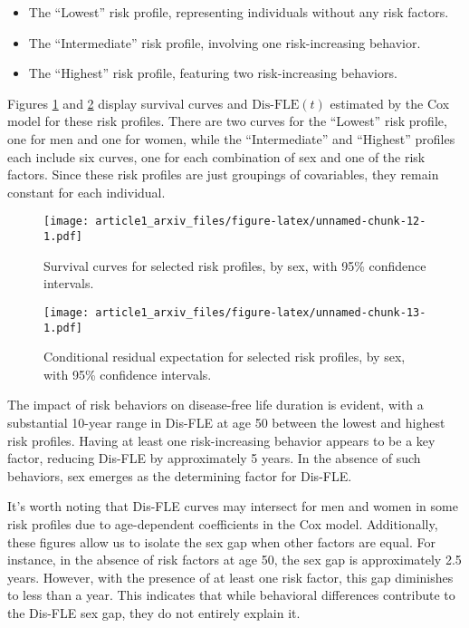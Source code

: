 \documentclass{article}
\providecommand{\tightlist}{%
  \setlength{\itemsep}{0pt}\setlength{\parskip}{0pt}}
\begin{document}
\begin{itemize}
\tightlist
\item
  The ``Lowest'' risk profile, representing individuals without any risk
  factors.
\item
  The ``Intermediate'' risk profile, involving one risk-increasing
  behavior.
\item
  The ``Highest'' risk profile, featuring two risk-increasing behaviors.
\end{itemize}

Figures \ref{fig:cox_f3_profile_surv_curves} and
\ref{fig:cox_f3_profile_surv_time_curves} display survival curves and
\(\text{Dis-FLE}(t)\) estimated by the Cox model for these risk
profiles. There are two curves for the ``Lowest'' risk profile, one for
men and one for women, while the ``Intermediate'' and ``Highest''
profiles each include six curves, one for each combination of sex and
one of the risk factors. Since these risk profiles are just groupings of
covariables, they remain constant for each individual.

\begin{figure}
\centering
\texttt{[image: article1\_arxiv\_files/figure-latex/unnamed-chunk-12-1.pdf]}
\caption{\label{fig:cox_f3_profile_surv_curves} Survival curves for
selected risk profiles, by sex, with 95\% confidence intervals.}
\end{figure}

\begin{figure}
\centering
\texttt{[image: article1\_arxiv\_files/figure-latex/unnamed-chunk-13-1.pdf]}
\caption{\label{fig:cox_f3_profile_surv_time_curves} Conditional
residual expectation for selected risk profiles, by sex, with 95\%
confidence intervals.}
\end{figure}

The impact of risk behaviors on disease-free life duration is evident,
with a substantial 10-year range in Dis-FLE at age 50 between the lowest
and highest risk profiles. Having at least one risk-increasing behavior
appears to be a key factor, reducing Dis-FLE by approximately 5 years.
In the absence of such behaviors, sex emerges as the determining factor
for Dis-FLE.

It's worth noting that Dis-FLE curves may intersect for men and women in
some risk profiles due to age-dependent coefficients in the Cox model.
Additionally, these figures allow us to isolate the sex gap when other
factors are equal. For instance, in the absence of risk factors at age
50, the sex gap is approximately 2.5 years. However, with the presence
of at least one risk factor, this gap diminishes to less than a year.
This indicates that while behavioral differences contribute to the
Dis-FLE sex gap, they do not entirely explain it.
\end{document}
